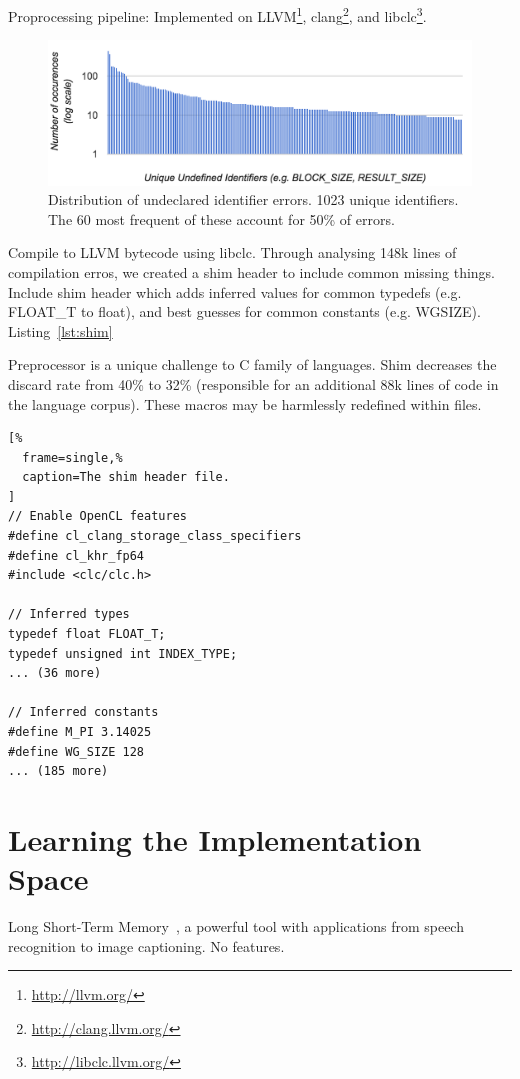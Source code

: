 \documentclass[preprint,nonatbib,10pt,nocopyrightspace]{sigplanconf}
\begin{document}
Proprocessing pipeline: Implemented on
LLVM\footnote{\url{http://llvm.org/}},
clang\footnote{\url{http://clang.llvm.org/}}, and
libclc\footnote{\url{http://libclc.llvm.org/}}.

\begin{figure}[t]
\includegraphics[width=\columnwidth]{img/undeclared-identifiers.png}
\caption{%
  Distribution of undeclared identifier errors. 1023 unique
  identifiers. The 60 most frequent of these account for 50\% of
  errors.%
}
\end{figure}

Compile to LLVM bytecode using libclc. Through analysing 148k lines of
compilation erros, we created a shim header to include common missing
things. Include shim header which adds inferred values for common
typedefs (e.g. FLOAT\_T to float), and best guesses for common
constants (e.g. WGSIZE). Listing~\ref{lst:shim}

Preprocessor is a unique challenge to C family of languages. Shim
decreases the discard rate from 40\% to 32\% (responsible for an
additional 88k lines of code in the language corpus). These macros may
be harmlessly redefined within files.

\lstset{language=[OpenCL]C}
\begin{lstlisting}[%
  frame=single,%
  caption=The shim header file.
]
// Enable OpenCL features
#define cl_clang_storage_class_specifiers
#define cl_khr_fp64
#include <clc/clc.h>

// Inferred types
typedef float FLOAT_T;
typedef unsigned int INDEX_TYPE;
... (36 more)

// Inferred constants
#define M_PI 3.14025
#define WG_SIZE 128
... (185 more)
\end{lstlisting}


\section{Learning the Implementation Space}\label{sec:ml}

Long Short-Term Memory~\cite{Hochreiter1997}, a powerful tool with
applications from speech recognition to image captioning. No features.
\end{document}
